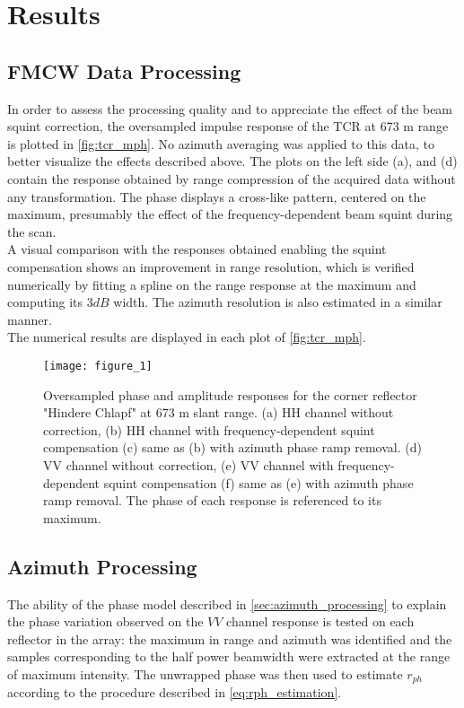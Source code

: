 \section{Results}\label{sec:results}
\subsection{FMCW Data Processing}\label{sec:res_SLC}
In order to assess the processing quality and to appreciate the effect of the beam squint correction,  the oversampled impulse response of the TCR at 673 m range is plotted in \autoref{fig:tcr_mph}. No azimuth averaging was applied to this data, to better visualize the effects described above. The plots on the left side (a), and (d) contain the response obtained by range compression of the acquired data without any transformation. The phase displays a cross-like pattern, centered on the maximum, presumably the effect of the frequency-dependent beam squint during the scan.\\ A visual comparison with the responses obtained enabling the squint compensation shows an improvement in range resolution, which is verified numerically by fitting a spline on the range response at the maximum and computing its $3 dB$ width. The azimuth resolution is also estimated in a similar manner.\\ The numerical results are displayed in each plot of \autoref{fig:tcr_mph}.
\begin{figure*}[ht]
	\centering
	\texttt{[image: figure\_1]}
	\caption{Oversampled phase and amplitude responses for the corner reflector "Hindere Chlapf" at 673 m slant range. (a) HH channel without correction, (b) HH channel with frequency-dependent squint compensation (c) same as (b) with azimuth phase ramp removal. (d) VV channel without correction, (e) VV channel with frequency-dependent squint compensation (f) same as (e) with azimuth phase ramp removal.
	The phase of each response is referenced to its maximum.}
	\label{fig:tcr_mph}
\end{figure*}
\subsection{Azimuth Processing}\label{sec:res_azimuth_processing}
The ability of the phase model described in \autoref{sec:azimuth_processing} to explain the phase variation observed on the $VV$ channel response is tested on each reflector in the array: the maximum in range and azimuth was identified and the samples corresponding to the half power beamwidth were extracted at the range of maximum intensity. The unwrapped phase was then used to estimate $r_{ph}$ according to the procedure described in \autoref{eq:rph_estimation}.

